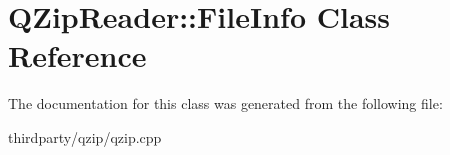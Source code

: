 \hypertarget{class_q_zip_reader_1_1_file_info}{}\section{Q\+Zip\+Reader\+:\+:File\+Info Class Reference}
\label{class_q_zip_reader_1_1_file_info}


The documentation for this class was generated from the following file\+:\begin{DoxyCompactItemize}
\item 
thirdparty/qzip/qzip.\+cpp\end{DoxyCompactItemize}
